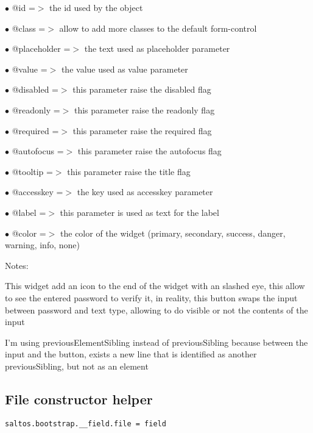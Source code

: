 \documentclass[a4paper]{book}
\begin{document}
\begin{compactitem}
\item[\color{myblue}$\bullet$] @id          =$>$ the id used by the object
\item[\color{myblue}$\bullet$] @class       =$>$ allow to add more classes to the default form-control
\item[\color{myblue}$\bullet$] @placeholder =$>$ the text used as placeholder parameter
\item[\color{myblue}$\bullet$] @value       =$>$ the value used as value parameter
\item[\color{myblue}$\bullet$] @disabled    =$>$ this parameter raise the disabled flag
\item[\color{myblue}$\bullet$] @readonly    =$>$ this parameter raise the readonly flag
\item[\color{myblue}$\bullet$] @required    =$>$ this parameter raise the required flag
\item[\color{myblue}$\bullet$] @autofocus   =$>$ this parameter raise the autofocus flag
\item[\color{myblue}$\bullet$] @tooltip     =$>$ this parameter raise the title flag
\item[\color{myblue}$\bullet$] @accesskey   =$>$ the key used as accesskey parameter
\item[\color{myblue}$\bullet$] @label       =$>$ this parameter is used as text for the label
\item[\color{myblue}$\bullet$] @color       =$>$ the color of the widget (primary, secondary, success, danger, warning, info, none)
\end{compactitem}

Notes:

This widget add an icon to the end of the widget with an slashed eye, this allow to
see the entered password to verify it, in reality, this button swaps the input between
password and text type, allowing to do visible or not the contents of the input

I'm using previousElementSibling instead of previousSibling because between the input and the
button, exists a new line that is identified as another previousSibling, but not as an element

\hypertarget{toc478}{}
\subsection{File constructor helper}

\begin{lstlisting}
saltos.bootstrap.__field.file = field
\end{lstlisting}
\end{document}
